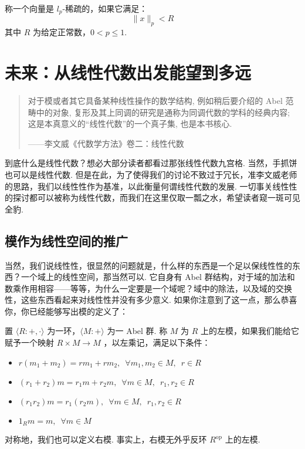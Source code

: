 \begin{definition}{}{}
    称一个向量是 $l_p$-稀疏的，如果它满足：
    \[ \lVert x \rVert_p < R \]
    其中 $R$ 为给定正常数，$0 < p \leqslant 1$.
\end{definition}

\section{未来：从线性代数出发能望到多远}

\begin{quote}
    \kaishu
    对于模或者其它具备某种线性操作的数学结构, 例如稍后要介绍的 Abel 范畴中的对象, 复形及其上同调的研究是通称为同调代数的学科的经典内容; 这是本真意义的``线性代数''的一个真子集, 也是本书核心.

    \begin{flushright}
        \kaishu
        ——李文威《代数学方法》卷二：线性代数
    \end{flushright}
\end{quote}

到底什么是线性代数？想必大部分读者都看过那张线性代数九宫格. 当然，手抓饼也可以是线性代数. 但是在此，为了使得我们的讨论不致过于冗长，准李文威老师的思路，我们以线性性作为基准，以此衡量何谓线性代数的发展. 一切事关线性性的探讨都可以被称为线性代数，而我们在这里仅取一瓢之水，希望读者窥一斑可见全豹.

\subsection{模作为线性空间的推广}

当然，我们说线性性，很显然的问题就是，什么样的东西是一个足以保线性性的东西？一个域上的线性空间，那当然可以. 它自身有 Abel 群结构，对于域的加法和数乘作用相容——等等，为什么一定要是一个域呢？域中的除法，以及域的交换性，这些东西看起来对线性性并没有多少意义. 如果你注意到了这一点，那么恭喜你，你已经能够写出模的定义了：

\begin{definition}{}{}
    置 $\langle R : +, \cdot \rangle$ 为一环，$\langle M : + \rangle$ 为一 Abel 群. 称 $M$ 为 $R$ 上的左模，如果我们能给它赋予一个映射 $R \times M \to M$ ，以左乘记，满足以下条件：

    \begin{itemize}
        \item $r(m_1 + m_2) = rm_1 + rm_2,\enspace \forall m_1, m_2 \in M,\enspace r \in R$

        \item $(r_1 + r_2)m = r_1m + r_2m,\enspace \forall m \in M,\enspace r_1, r_2 \in R$

        \item $(r_1r_2)m = r_1(r_2m),\enspace \forall m \in M,\enspace r_1, r_2 \in R$

        \item $1_Rm = m,\enspace \forall m \in M$
    \end{itemize}

    对称地，我们也可以定义右模. 事实上，右模无外乎反环 $R^{\mathrm{op}}$ 上的左模.
\end{definition}

